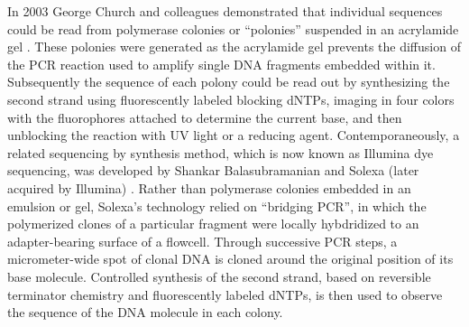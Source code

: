 In 2003 George Church and colleagues demonstrated that individual sequences could be read from polymerase colonies or ``polonies'' suspended in an acrylamide gel \cite{mitra2003fluorescent}.
These polonies were generated as the acrylamide gel prevents the diffusion of the PCR reaction used to amplify single DNA fragments embedded within it.
Subsequently the sequence of each polony could be read out by synthesizing the second strand using fluorescently labeled blocking dNTPs, imaging in four colors with the fluorophores attached to determine the current base, and then unblocking the reaction with UV light or a reducing agent.
Contemporaneously, a related sequencing by synthesis method, which is now known as Illumina dye sequencing, was developed by Shankar Balasubramanian and Solexa (later acquired by Illumina) \cite{balasubramanian2004arrayed, bentley2008accurate}.
Rather than polymerase colonies embedded in an emulsion or gel, Solexa's technology relied on ``bridging PCR'', in which the polymerized clones of a particular fragment were locally hybdridized to an adapter-bearing surface of a flowcell.
Through successive PCR steps, a micrometer-wide spot of clonal DNA is cloned around the original position of its base molecule.
Controlled synthesis of the second strand, based on reversible terminator chemistry \cite{canard1994dna} and fluorescently labeled dNTPs, is then used to observe the sequence of the DNA molecule in each colony.

